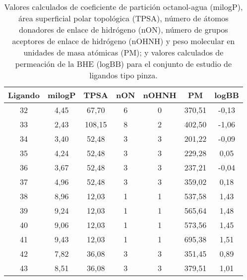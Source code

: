 \clearpage

\begin{table}[h]
\centering
\caption{Valores calculados de coeficiente de partición octanol-agua (milogP), área superficial polar topológica (TPSA), número de átomos donadores de enlace de hidrógeno (nON), número de grupos aceptores de enlace de hidrógeno (nOHNH) y peso molecular en unidades de masa atómicas (PM); y valores calculados de permeación de la BHE (logBB) para el conjunto de estudio de ligandos tipo pinza.}
\begin{tabular}{c|ccccc|c}
\hline
\textbf{Ligando} & \textbf{milogP} & \textbf{TPSA} & \textbf{nON} & \textbf{nOHNH} & \textbf{PM} & \textbf{logBB} \\ \hline
32               & 4,45             & 67,70         & 6            & 0              & 370,51      & -0,13           \\
33               & 2,43             & 108,15        & 8            & 2              & 402,50      & -1,06           \\
34               & 3,40             & 52,48         & 3            & 3              & 201,22      & -0,09           \\
35               & 4,24             & 52,48         & 3            & 3              & 229,28      & 0,05            \\
36               & 3,67             & 52,48         & 3            & 3              & 237,21      & -0,04           \\
37               & 4,96             & 52,48         & 3            & 3              & 359,02      & 0,18            \\
38               & 8,96             & 12,03         & 1            & 1              & 537,58      & 1,43            \\
39               & 9,24             & 12,03         & 1            & 1              & 565,64      & 1,48            \\
40               & 9,06             & 12,03         & 1            & 1              & 573,56      & 1,45            \\
41               & 9,43             & 12,03         & 1            & 1              & 695,38      & 1,51            \\
42               & 7,82             & 36,08         & 3            & 3              & 351,45      & 0,89            \\
43               & 8,51             & 36,08         & 3            & 3              & 379,51      & 1,01            \\

\end{tabular}
\end{table}
